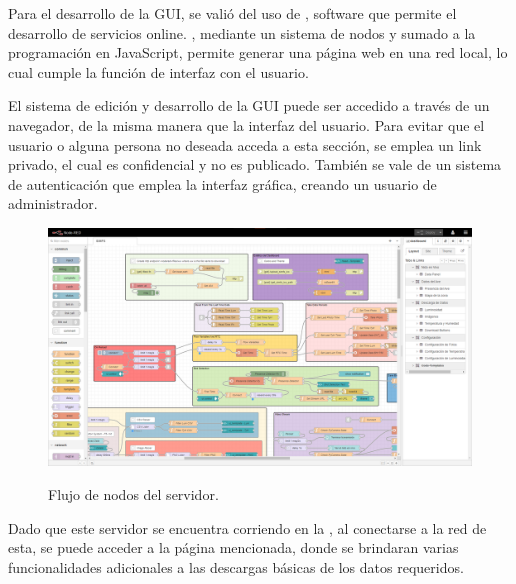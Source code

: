 Para el desarrollo de la GUI, se valió del uso de \nodered, software que permite el desarrollo de servicios online. \nodered, mediante un sistema de nodos y sumado a la programación en JavaScript, permite generar una página web en una red local, lo cual cumple la función de interfaz con el usuario.

El sistema de edición y desarrollo de la GUI puede ser accedido a través de un navegador, de la misma manera que la interfaz del usuario. Para evitar que el usuario o alguna persona no deseada acceda a esta sección, se emplea un link privado, el cual es confidencial y no es publicado. También se vale de un sistema de autenticación que emplea la interfaz gráfica, creando un usuario de administrador.
\begin{figure}[H]
	\centering
	\includegraphics[width=0.9\linewidth]{ImagenesIngenieria de Detalle/Node-Red-Flow}
	\label{fig:node_red_flow}
	\caption{Flujo de nodos del servidor.}
\end{figure}

Dado que este servidor se encuentra corriendo en la \rpi, al conectarse a la red de esta, se puede acceder a la página mencionada, donde se brindaran varias funcionalidades adicionales a las descargas básicas de los datos requeridos.

